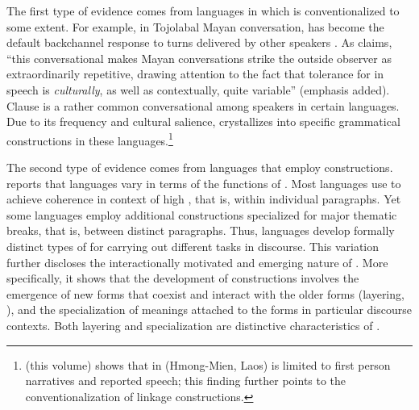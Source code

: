 \documentclass[output=paper]{LSP/langsci}
\begin{document}
The first type of evidence comes from languages in which  is conventionalized to some extent. For example, in Tojolabal Mayan conversation,  has become the default backchannel response to turns delivered by other speakers \citep[][260--261]{brody.1986}. As \citet[][224]{brown.2000} claims, ``this conversational  makes Mayan conversations strike the outside observer as extraordinarily repetitive, drawing attention to the fact that tolerance for  in speech is \textit{culturally}, as well as contextually, quite variable'' (emphasis added). Clause  is a rather common conversational  among speakers in certain languages. Due to its frequency \citep{bybee03} and cultural salience,  crystallizes into specific grammatical constructions in these languages.\footnote{\citeauthor{jarkey18} (this volume) shows that  in  (Hmong-Mien, Laos) is limited to first person narratives and reported speech; this finding further points to the conventionalization of linkage constructions.} 

The second type of evidence comes from languages that employ  constructions. \citet[][112--113]{Guillaume2011} reports that languages vary in terms of the functions of . Most languages use  to achieve coherence in context of high , that is, within individual paragraphs. Yet some languages employ additional  constructions specialized for major thematic breaks, that is, between distinct paragraphs. Thus, languages develop formally distinct types of  for carrying out different tasks in discourse. This variation further discloses the interactionally motivated and emerging nature of . More specifically, it shows that the development of  constructions involves the emergence of new forms that coexist and interact with the older forms (layering, \citealt{hopper91}), and the specialization of meanings attached to the forms in particular discourse contexts. Both layering and specialization are distinctive characteristics of  \citep{hopper93}. 
\end{document}
